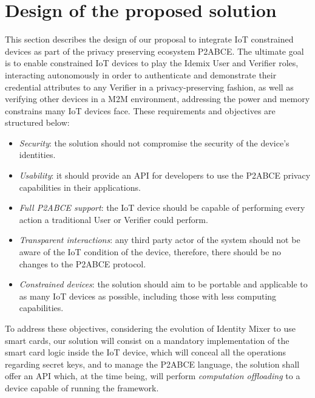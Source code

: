 
\section{Design of the proposed solution}\label{ch:design}

This section describes the design of our proposal to integrate IoT constrained devices as part of the privacy preserving ecosystem P2ABCE. The ultimate goal is to enable constrained IoT devices to play the Idemix User and Verifier roles, interacting autonomously in order to authenticate and demonstrate their credential attributes to any Verifier in a privacy-preserving fashion, as well as verifying other devices in a M2M environment, addressing the power and memory constrains many IoT devices face. These requirements and objectives are structured below:



\begin{itemize}
	\item \textit{Security}: the solution should not compromise the security of the device's identities.
	\item \textit{Usability}: it should provide an API for developers to use the P2ABCE privacy capabilities in their applications.
	\item \textit{Full P2ABCE support}: the IoT device should be capable of performing every action a traditional User or Verifier could perform.
	\item \textit{Transparent interactions}: any third party actor of the system should not be aware of the IoT condition of the device, therefore, there should be no changes to the P2ABCE protocol.
	\item \textit{Constrained devices}: the solution should aim to be portable and applicable to as many IoT devices as possible, including those with less computing capabilities.
\end{itemize}

\hfil

To address these objectives, considering the evolution of Identity Mixer to use smart cards, our solution will consist on a mandatory implementation of the smart card logic inside the IoT device, which will conceal all the operations regarding secret keys, and to manage the P2ABCE language, the solution shall offer an API which, at the time being, will perform \textit{computation offloading} to a device capable of running the framework.

